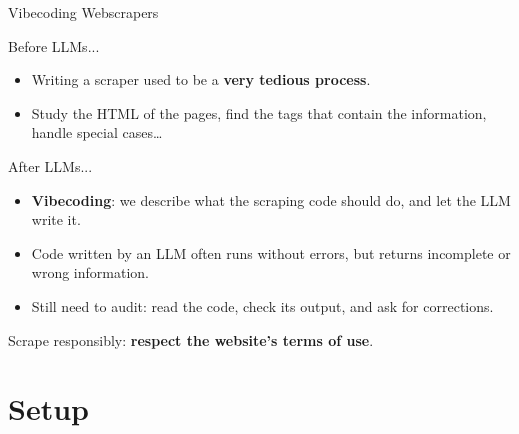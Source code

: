 \documentclass[9pt,aspectratio=169]{beamer}
\begin{document}
\begin{frame}{Vibecoding Webscrapers}

Before LLMs...
\begin{itemize}
  \item Writing a scraper used to be a \textbf{very tedious process}.
  \item Study the HTML of the pages, find the tags that contain the information, handle special cases\dots
\end{itemize}

\pause
After LLMs...
\begin{itemize}
  \item \textbf{Vibecoding}: we describe what the scraping code should do, and let the LLM write it.
    \item \alert{Code written by an LLM often runs without errors, but returns incomplete or wrong information.}
    \item Still need to audit: read the code, check its output, and ask for corrections.
\end{itemize}

\pause
\begin{block}{}
\begin{center}
  Scrape responsibly: \textbf{respect the website's terms of use}.
\end{center}
\end{block}
\end{frame}

\section{Setup}
\end{document}
